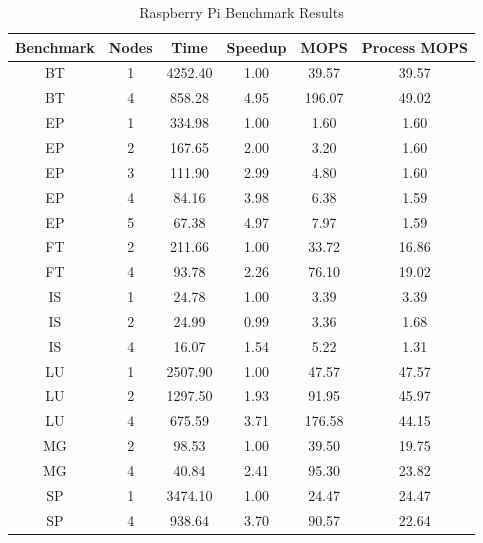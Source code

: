 \documentclass{acm_proc_article-sp}
\begin{document}
\begin{table}[tbp]
\centering
\caption{Raspberry Pi Benchmark Results}
\label{PiTable}
\begin{tabular}{ c | c || c | c | c | c }
	Benchmark & Nodes & Time & Speedup & MOPS & Process MOPS\\ \hline
    BT & 1 & 4252.40 & 1.00  & 39.57 & 39.57 \\
    BT & 4 & 858.28 & 4.95  & 196.07 & 49.02 \\
    EP & 1 & 334.98 & 1.00  & 1.60   & 1.60 \\
    EP & 2 & 167.65 & 2.00  & 3.20   & 1.60 \\
    EP & 3 & 111.90 & 2.99  & 4.80   & 1.60 \\
    EP & 4 & 84.16 & 3.98  & 6.38  & 1.59 \\
    EP & 5 & 67.38 & 4.97  & 7.97  & 1.59 \\
    FT & 2 & 211.66 & 1.00  & 33.72 & 16.86 \\
    FT & 4 & 93.78 & 2.26  & 76.10  & 19.02 \\
    IS & 1 & 24.78 & 1.00  & 3.39  & 3.39 \\
    IS & 2 & 24.99 & 0.99  & 3.36  & 1.68 \\
    IS & 4 & 16.07 & 1.54  & 5.22  & 1.31 \\
    LU & 1 & 2507.90 & 1.00  & 47.57 & 47.57 \\
    LU & 2 & 1297.50 & 1.93  & 91.95 & 45.97 \\
    LU & 4 & 675.59 & 3.71  & 176.58 & 44.15 \\
    MG & 2 & 98.53 & 1.00  & 39.50  & 19.75 \\
    MG & 4 & 40.84 & 2.41  & 95.30  & 23.82 \\
    SP & 1 & 3474.10 & 1.00  & 24.47 & 24.47 \\
    SP & 4 & 938.64 & 3.70  & 90.57 & 22.64 \\
\end{tabular}
\end{table}

\clearpage


\end{document}
